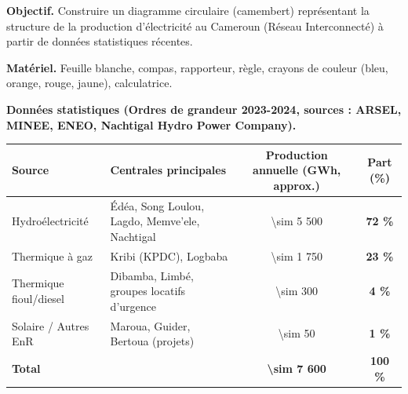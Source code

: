\documentclass[11pt]{article}
\begin{document}
\begin{experience}
\textbf{Objectif.} Construire un diagramme circulaire (camembert) représentant la structure de la production d'électricité au Cameroun (Réseau Interconnecté) à partir de données statistiques récentes.

\textbf{Matériel.} Feuille blanche, compas, rapporteur, règle, crayons de couleur (bleu, orange, rouge, jaune), calculatrice.

\textbf{Données statistiques (Ordres de grandeur 2023-2024, sources : ARSEL, MINEE, ENEO, Nachtigal Hydro Power Company).}
\begin{center}
\begin{tabularx}{\linewidth}{|l|X|c|c|}
\hline
\rowcolor{popblueL} \textbf{Source} & \textbf{Centrales principales} & \textbf{Production annuelle (GWh, approx.)} & \textbf{Part (\%)} \\
\hline
Hydroélectricité & Édéa, Song Loulou, Lagdo, Memve'ele, Nachtigal & \SI{\sim 5 500}{} & \textbf{72 \%} \\
\hline
Thermique à gaz & Kribi (KPDC), Logbaba & \SI{\sim 1 750}{} & \textbf{23 \%} \\
\hline
Thermique fioul/diesel & Dibamba, Limbé, groupes locatifs d'urgence & \SI{\sim 300}{} & \textbf{4 \%} \\
\hline
Solaire / Autres EnR & Maroua, Guider, Bertoua (projets) & \SI{\sim 50}{} & \textbf{1 \%} \\
\hline
\textbf{Total} & & \textbf{\SI{\sim 7 600}{}} & \textbf{100 \%} \\
\hline
\end{tabularx}
\end{center}


\end{experience}
\end{document}
